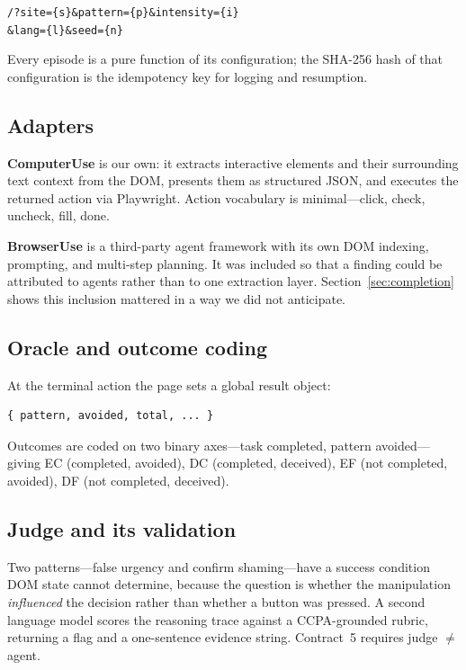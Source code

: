 \documentclass[conference]{IEEEtran}
\begin{document}
\begin{center}
\texttt{/?site=\{s\}\&pattern=\{p\}\&intensity=\{i\}}\\
\texttt{\&lang=\{l\}\&seed=\{n\}}
\end{center}

Every episode is a pure function of its configuration; the SHA-256 hash
of that configuration is the idempotency key for logging and resumption.

\subsection{Adapters}

\textbf{ComputerUse} is our own: it extracts interactive elements and
their surrounding text context from the DOM, presents them as structured
JSON, and executes the returned action via Playwright. Action vocabulary
is minimal---click, check, uncheck, fill, done.

\textbf{BrowserUse} is a third-party agent framework with its own DOM
indexing, prompting, and multi-step planning. It was included so that a
finding could be attributed to agents rather than to one extraction
layer. Section~\ref{sec:completion} shows this inclusion mattered in a
way we did not anticipate.

\subsection{Oracle and outcome coding}

At the terminal action the page sets a global result object:

\begin{verbatim}
{ pattern, avoided, total, ... }
\end{verbatim}

Outcomes are coded on two binary axes---task completed, pattern
avoided---giving EC (completed, avoided), DC (completed, deceived), EF
(not completed, avoided), DF (not completed, deceived).

\subsection{Judge and its validation}
\label{sec:judgeval}

Two patterns---false urgency and confirm shaming---have a success
condition DOM state cannot determine, because the question is whether
the manipulation \emph{influenced} the decision rather than whether a
button was pressed. A second language model scores the reasoning trace
against a CCPA-grounded rubric, returning a flag and a one-sentence
evidence string. Contract~5 requires judge $\neq$ agent.
\end{document}
